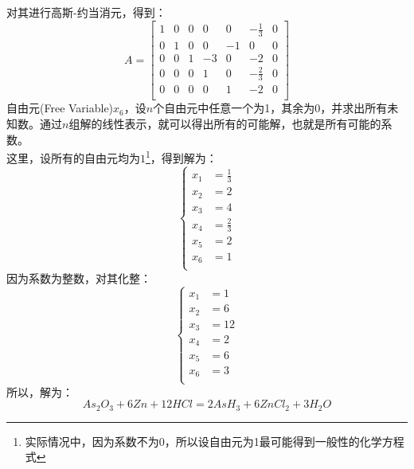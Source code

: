 \documentclass[1pt]{article}
\begin{document}
    对其进行高斯-约当消元，得到：\\
    \begin{equation}
      A=\left [
        \begin{array}{cccccc|c}
          1 & 0 & 0 & 0 & 0 & -\frac{1}{3} & 0 \\
          0 & 1 & 0 & 0 & -1 & 0 & 0 \\
          0 & 0 & 1 & -3 & 0 & -2 & 0 \\
          0 & 0 & 0 & 1 & 0 & -\frac{2}{3} & 0 \\
          0 & 0 & 0 & 0 & 1 & -2 & 0 \\
        \end{array}
      \right]
    \end{equation}
    自由元(Free Variable)$x_{6}$，设$n$个自由元中任意一个为1，其余为0，并求出所有未知数。通过$n$组解的线性表示，就可以得出所有的可能解，也就是所有可能的系数。\\
    这里，设所有的自由元均为$1$\footnote{实际情况中，因为系数不为0，所以设自由元为1最可能得到一般性的化学方程式}，得到解为：\\
    \begin{equation}
      \left\{
        \begin{aligned}
          x_{1}&=\frac{1}{3}\\
          x_{2}&=2\\
          x_{3}&=4\\
          x_{4}&=\frac{2}{3}\\
          x_{5}&=2\\
          x_{6}&=1\\
        \end{aligned}
      \right.
    \end{equation}
    因为系数为整数，对其化整：\\
    \begin{equation}
      \left\{
        \begin{aligned}
          x_{1}&=1\\
          x_{2}&=6\\
          x_{3}&=12\\
          x_{4}&=2\\
          x_{5}&=6\\
          x_{6}&=3\\
        \end{aligned}
      \right.
    \end{equation}
    所以，解为：
    \begin{equation}
      As_{2}O_{3}+6Zn+12HCl=2AsH_{3}+6ZnCl_{2}+3H_{2}O
    \end{equation}
\end{document}
